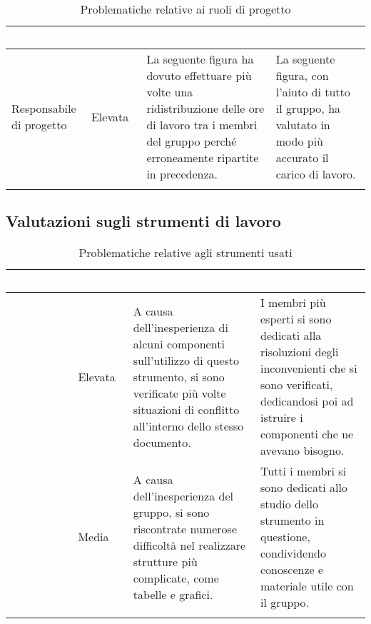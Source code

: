 \renewcommand{\arraystretch}{1.5}
\centering
\begin{longtable}{C{2.5cm} C{2.5cm} C{6cm} C{5cm}}
\textcolor{white}{\textbf{Problema}} &
\textcolor{white}{\textbf{Gravità}} &
\textcolor{white}{\textbf{Descrizione}} &	
\textcolor{white}{\textbf{Soluzione}} \\	
\endhead

Responsabile di progetto & Elevata & 
La seguente figura ha dovuto effettuare più volte una ridistribuzione delle ore di lavoro tra i membri del gruppo perché erroneamente ripartite in precedenza. &
La seguente figura, con l'aiuto di tutto il gruppo, ha valutato in modo più accurato il carico di lavoro. \\

 \caption{Problematiche relative ai ruoli di progetto}
\end{longtable}

\subsection{Valutazioni sugli strumenti di lavoro}

\renewcommand{\arraystretch}{1.5}
\centering
\begin{longtable}{C{2.5cm} C{2.5cm} C{6cm} C{5cm}}
\textcolor{white}{\textbf{Problema}} &
\textcolor{white}{\textbf{Gravità}} &
\textcolor{white}{\textbf{Descrizione}} &	
\textcolor{white}{\textbf{Soluzione}} \\	
\endhead

 & Elevata & 
A causa dell'inesperienza di alcuni componenti sull'utilizzo di questo strumento, si sono verificate più volte situazioni di conflitto all'interno dello stesso documento. &
I membri più esperti si sono dedicati alla risoluzioni degli inconvenienti che si sono verificati, dedicandosi poi ad istruire i componenti che ne avevano bisogno.  \\

 & Media & 
A causa dell'inesperienza del gruppo, si sono riscontrate numerose difficoltà nel realizzare strutture più complicate, come tabelle e grafici. &
Tutti i membri si sono dedicati allo studio dello strumento in questione, condividendo conoscenze e materiale utile con il gruppo.  \\

 \caption{Problematiche relative agli strumenti usati}
\end{longtable}